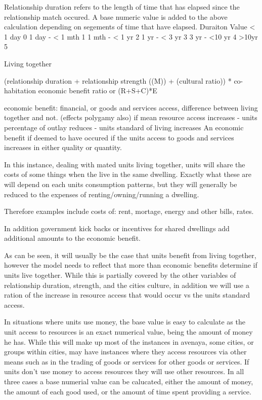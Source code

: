 Relationship duration refers to the length of time that has elapsed since the relationship match occured. A base numeric value is added to the above calculation depending on segements of time that have elapsed.
Duraiton	  Value
< 1 day		    0
1 day - < 1 mth     1
1 mth - < 1 yr	    2
1 yr  - < 3 yr	    3
3 yr  - <10 yr	    4
>10yr		    5

Living together


(relationship duration + relationship strength ((M)) + (cultural ratio)) * co-habitation economic benefit ratio
or
(R+S+C)*E


economic benefit: financial, or goods and services access, difference between living together and not. (effects polygamy also)
if mean resource access increases 	- units percentage of outlay reduces
					- units standard of living increases
An economic benefit if deemed to have occured if the units access to goods and services increases in either quality or quantity.

In this instance, dealing with mated units living together, units will share the costs of some things when the live in the same dwelling. Exactly what these are will depend on each units consumption patterns, but they will generally be reduced to the expenses of renting/owning/running a dwelling. 

Therefore examples include costs of: rent, mortage, energy and other bills, rates.

In addition government kick backs or incentives for shared dwellings add additional amounts to the economic benefit.

As can be seen, it will usually be the case that units benefit from living together, however the model needs to reflect that more than economic benefits determine if units live together. While this is partially covered by the other variables of relationship duration, strength, and the cities culture, in addition we will use a ration of the increase in resource access that would occur vs the units standard access.

In situations where units use money, the base value is easy to calculate as the unit access to resources is an exact numerical value, being the amount of money he has. While this will make up most of the instances in avenaya, some cities, or groups within cities, may have instances where they access resources via other means such as in the trading of goods or services for other goods or services. If units don't use money to access resources they will use other resources. In all three cases a base numerial value can be calucated, either the amount of money, the amount of each good used, or the amount of time spent providing a service.

